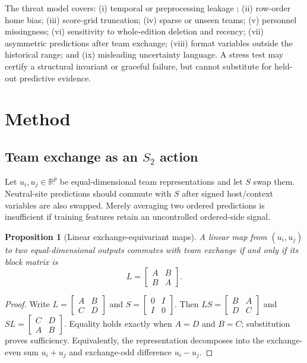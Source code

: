 \documentclass[11pt]{article}
\newtheorem{proposition}{Proposition}
\begin{document}
The threat model covers: (i) temporal or preprocessing leakage
\citep{kaufman2012,kapoor2023}; (ii) row-order home bias; (iii) score-grid truncation; (iv) sparse or
unseen teams; (v) personnel missingness; (vi) sensitivity to whole-edition deletion and recency;
(vii) asymmetric predictions after team exchange; (viii) format variables outside the historical
range; and (ix) misleading uncertainty language.  A stress test may certify a structural invariant
or graceful failure, but cannot substitute for held-out predictive evidence.

\section{Method}

\subsection{Team exchange as an \texorpdfstring{$S_2$}{S2} action}

Let $u_i,u_j\in\mathbb R^p$ be equal-dimensional team representations and let $S$ swap them.
Neutral-site predictions should commute with $S$ after signed host/context variables are also
swapped.  Merely averaging two ordered predictions is insufficient if training features retain an
uncontrolled ordered-side signal.

\begin{proposition}[Linear exchange-equivariant maps]
A linear map from $(u_i,u_j)$ to two equal-dimensional outputs commutes with team exchange if and
only if its block matrix is
\begin{equation}
 L=\begin{bmatrix}A&B\\B&A\end{bmatrix}.
\end{equation}
\end{proposition}

\begin{proof}
Write $L=\left[\begin{smallmatrix}A&B\\C&D\end{smallmatrix}\right]$ and
$S=\left[\begin{smallmatrix}0&I\\I&0\end{smallmatrix}\right]$.  Then
$LS=\left[\begin{smallmatrix}B&A\\D&C\end{smallmatrix}\right]$ and
$SL=\left[\begin{smallmatrix}C&D\\A&B\end{smallmatrix}\right]$.  Equality holds exactly when
$A=D$ and $B=C$; substitution proves sufficiency.  Equivalently, the representation decomposes into
the exchange-even sum $u_i+u_j$ and exchange-odd difference $u_i-u_j$.
\end{proof}
\end{document}
